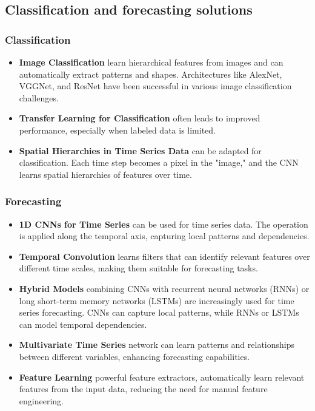 \documentclass{article}
\begin{document}
\subsection{Classification and forecasting solutions}
\subsubsection{Classification}
\begin{itemize}
    \item \textbf{Image Classification}  learn hierarchical features from images and can automatically extract patterns and shapes. Architectures like AlexNet, VGGNet, and ResNet have been successful in various image classification challenges\cite{r3}.
    \item \textbf{Transfer Learning for Classification} often leads to improved performance, especially when labeled data is limited.
    \item \textbf{Spatial Hierarchies in Time Series Data} can be adapted for classification. Each time step becomes a pixel in the "image," and the CNN learns spatial hierarchies of features over time.
\end{itemize}

\subsubsection{Forecasting}
\begin{itemize}
    \item \textbf{1D CNNs for Time Series} can be used for time series data. The operation is applied along the temporal axis, capturing local patterns and dependencies.
    \item \textbf{Temporal Convolution} learns filters that can identify relevant features over different time scales, making them suitable for forecasting tasks.
    \item \textbf{Hybrid Models} combining CNNs with recurrent neural networks (RNNs) or long short-term memory networks (LSTMs) are increasingly used for time series forecasting. CNNs can capture local patterns, while RNNs or LSTMs can model temporal dependencies.\cite{r4}
    \item \textbf{Multivariate Time Series} network can learn patterns and relationships between different variables, enhancing forecasting capabilities.
    \item \textbf{Feature Learning} powerful feature extractors, automatically learn relevant features from the input data, reducing the need for manual feature engineering.
\end{itemize}
\end{document}
